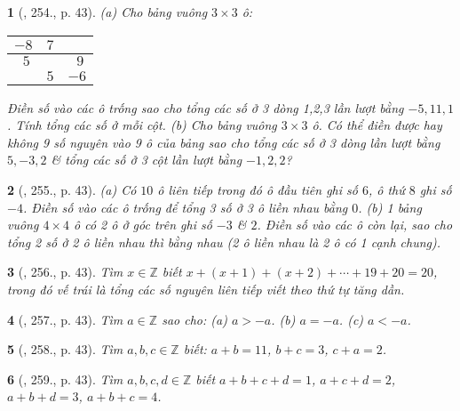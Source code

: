 \documentclass{article}
\newtheorem{baitoan}{}
\begin{document}
\begin{baitoan}[\cite{Binh_Toan_6_tap_1}, 254., p. 43]
	(a) Cho bảng vuông $3\times 3$ ô:
	\begin{table}[H]
		\centering
		\begin{tabular}{|c|c|c|}
			\hline
			$-8$ & $7$ &  \\
			\hline
			$\ \ 5$ &  & $\ \ 9$ \\
			\hline
			& $5$ & $-6$ \\
			\hline
		\end{tabular}
	\end{table}
	\noindent Điền số vào các ô trống sao cho tổng các số ở 3 dòng 1,2,3 lần lượt bằng $-5,11,1$. Tính tổng các số ở mỗi cột. (b) Cho bảng vuông $3\times 3$ ô. Có thể điền được hay không 9 số nguyên vào 9 ô của bảng sao cho tổng các số ở 3 dòng lần lượt bằng $5,-3,2$ \& tổng các số ở 3 cột lần lượt bằng $-1,2,2$?
\end{baitoan}

\begin{baitoan}[\cite{Binh_Toan_6_tap_1}, 255., p. 43]
	(a) Có $10$ ô liên tiếp trong đó ô đầu tiên ghi số $6$, ô thứ $8$ ghi số $-4$. Điền số vào các ô trống để tổng 3 số ở 3 ô liền nhau bằng $0$. (b) 1 bảng vuông $4\times 4$ ô có 2 ô ở góc trên ghi số $-3$ \& $2$. Điền số vào các ô còn lại, sao cho tổng 2 số ở 2 ô liền nhau thì bằng nhau (2 ô liền nhau là 2 ô có 1 cạnh chung).	
\end{baitoan}

\begin{baitoan}[\cite{Binh_Toan_6_tap_1}, 256., p. 43]
	Tìm $x\in\mathbb{Z}$ biết $x + (x + 1) + (x + 2) + \cdots + 19 + 20 = 20$, trong đó vế trái là tổng các số nguyên liên tiếp viết theo thứ tự tăng dần.
\end{baitoan}

\begin{baitoan}[\cite{Binh_Toan_6_tap_1}, 257., p. 43]
	Tìm $a\in\mathbb{Z}$ sao cho: (a) $a > -a$. (b) $a = -a$. (c) $a < -a$.
\end{baitoan}

\begin{baitoan}[\cite{Binh_Toan_6_tap_1}, 258., p. 43]
	Tìm $a,b,c\in\mathbb{Z}$ biết: $a + b = 11$, $b + c = 3$, $c + a = 2$.
\end{baitoan}

\begin{baitoan}[\cite{Binh_Toan_6_tap_1}, 259., p. 43]
	Tìm $a,b,c,d\in\mathbb{Z}$ biết $a + b + c + d = 1$, $a + c + d = 2$, $a + b + d = 3$, $a + b + c = 4$.
\end{baitoan}
\end{document}
